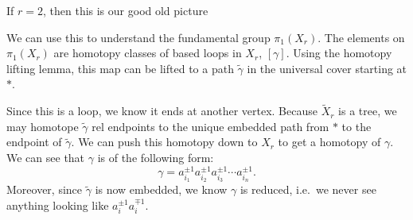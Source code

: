 \documentclass[a4paper]{article}
\begin{document}
If $r = 2$, then this is our good old picture %
\begin{center}
\end{center}
We can use this to understand the fundamental group $\pi_1(X_r)$. The elements on $\pi_1 (X_r)$ are homotopy classes of based loops in $X_r$, $[\gamma]$. Using the homotopy lifting lemma, this map can be lifted to a path $\tilde{\gamma}$ in the universal cover starting at $*$.


Since this is a loop, we know it ends at another vertex. Because $\tilde{X}_r$ is a tree, we may homotope $\tilde{\gamma}$ rel endpoints to the unique embedded path from $*$ to the endpoint of $\tilde{\gamma}$. We can push this homotopy down to $X_r$ to get a homotopy of $\gamma$. We can see that $\gamma$ is of the following form:
\[
  \gamma = a_{i_1}^{\pm 1} a_{i_2}^{\pm 1} a_{i_3}^{\pm 1}\cdots a_{i_n}^{\pm 1}.
\]
Moreover, since $\tilde{\gamma}$ is now embedded, we know $\gamma$ is reduced, i.e.\ we never see anything looking like $a_i^{\pm 1} a_i^{\mp 1}$.
\end{document}
